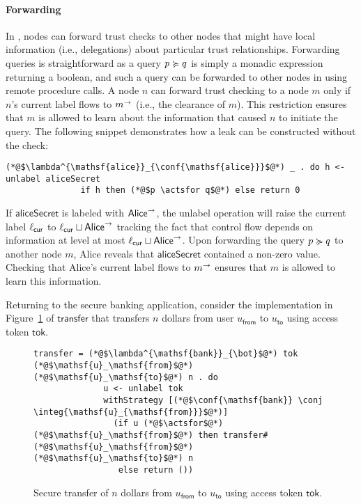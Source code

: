 \paragraph{Forwarding}
In \lang{}, nodes can forward trust checks to other nodes that might have local information (i.e., delegations) about particular trust relationships. Forwarding queries is straightforward as a query $p \succcurlyeq q$ is simply a monadic expression returning a boolean, and such a query can be forwarded to other nodes in \lang{} using remote procedure calls.
A node $n$ can forward trust checking to a node $m$ only if $n$'s current label flows to $m^{\rightarrow}$ (i.e., the clearance of $m$). This restriction ensures that $m$ is allowed to learn about the information that caused $n$ to initiate the query.  The following snippet demonstrates how a leak can be constructed without the check:
\begin{lstlisting}
(*@$\lambda^{\mathsf{alice}}_{\conf{\mathsf{alice}}}$@*) _ . do h <- unlabel aliceSecret
               if h then (*@$p \actsfor q$@*) else return 0
\end{lstlisting}
If $\mathsf{aliceSecret}$ is labeled with $\mathsf{Alice}^{\rightarrow}$, the unlabel operation will raise the current label $\ell_{\mathsf{cur}}$ to $\ell_{\mathsf{cur}} \sqcup \mathsf{Alice}^{\rightarrow}$ tracking the fact that control flow depends on information at level at most $\ell_{\mathsf{cur}} \sqcup \mathsf{Alice}^{\rightarrow}$. Upon forwarding the query $p \succcurlyeq q$ to another node $m$, Alice reveals that $\mathsf{aliceSecret}$ contained a non-zero value. Checking that Alice's current label flows to $m^{\rightarrow}$ ensures that $m$ is allowed to learn this information.

Returning to the secure banking application, consider the implementation in Figure~\ref{fig:sec-transfer} of $\mathsf{transfer}$ that transfers $n$ dollars from user $u_\mathsf{from}$ to $u_\mathsf{to}$ using access token $\mathsf{tok}$.

\begin{figure}
\centering
\begin{lstlisting}
transfer = (*@$\lambda^{\mathsf{bank}}_{\bot}$@*) tok (*@$\mathsf{u}_\mathsf{from}$@*) (*@$\mathsf{u}_\mathsf{to}$@*) n . do
              u <- unlabel tok
              withStrategy [(*@$\conf{\mathsf{bank}} \conj \integ{\mathsf{u}_{\mathsf{from}}}$@*)]
                (if u (*@$\actsfor$@*) (*@$\mathsf{u}_\mathsf{from}$@*) then transfer# (*@$\mathsf{u}_\mathsf{from}$@*) (*@$\mathsf{u}_\mathsf{to}$@*) n
                 else return ())
\end{lstlisting}
\caption{Secure transfer of $n$ dollars from $u_{\mathsf{from}}$ to $u_{\mathsf{to}}$ using access token $\mathsf{tok}$.}
\label{fig:sec-transfer}
\end{figure}


